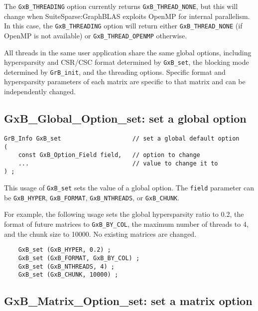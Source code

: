 \documentclass[12pt]{article}
\begin{document}
The \verb'GxB_THREADING' option currently returns \verb'GxB_THREAD_NONE', but
this will change when SuiteSparse:GraphBLAS exploits OpenMP for internal
parallelism.  In this case, the \verb'GxB_THREADING' option will return either
\verb'GxB_THREAD_NONE' (if OpenMP is not available) or \verb'GxB_THREAD_OPENMP'
otherwise.

All threads in the same user application share the same global options,
including hypersparsity and CSR/CSC format determined by \verb'GxB_set', the
blocking mode determined by \verb'GrB_init', and the threading options.
Specific format and hypersparsity parameters of each matrix are specific to
that matrix and can be independently changed.

\newpage
\subsection{{\sf GxB\_Global\_Option\_set:} set a global option}

\begin{mdframed}[userdefinedwidth=6in]
{\footnotesize
\begin{verbatim}
GrB_Info GxB_set                    // set a global default option
(
    const GxB_Option_Field field,   // option to change
    ...                             // value to change it to
) ;
\end{verbatim} } \end{mdframed}

This usage of \verb'GxB_set' sets the value of a global option.
The \verb'field' parameter can be \verb'GxB_HYPER', \verb'GxB_FORMAT',
\verb'GxB_NTHREADS', or \verb'GxB_CHUNK'.

For example, the following usage sets the global hypersparsity ratio to 0.2,
the format of future matrices to \verb'GxB_BY_COL', the maximum number
of threads to 4, and the chunk size to 10000.
No existing matrices are changed.

{\footnotesize
\begin{verbatim}
    GxB_set (GxB_HYPER, 0.2) ;
    GxB_set (GxB_FORMAT, GxB_BY_COL) ;
    GxB_set (GxB_NTHREADS, 4) ;
    GxB_set (GxB_CHUNK, 10000) ;
\end{verbatim} }

\subsection{{\sf GxB\_Matrix\_Option\_set:} set a matrix option}
\end{document}
